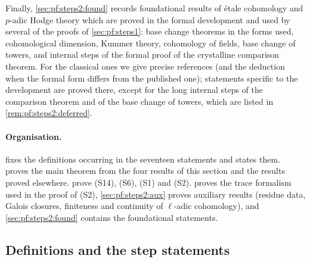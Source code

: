 Finally, \cref{sec:pf:steps2:found} records foundational results of \'etale cohomology and $p$-adic
Hodge theory which are proved in the formal development and used by several of the proofs of
\cref{sec:pf:steps1}: base change theorems in the forms used, cohomological dimension, Kummer
theory, cohomology of fields, base change of towers, and internal steps of the formal proof of the
crystalline comparison theorem. For the classical ones we give precise references (and the deduction
when the formal form differs from the published one); statements specific to the development are
proved there, except for the long internal steps of the comparison theorem and of the base change of
towers, which are listed in \cref{rem:pf:steps2:deferred}.

\paragraph{Organisation.}
 fixes the definitions occurring in the seventeen statements and states
them.  proves the main theorem from the four results of this section
and the results proved elsewhere.
 prove (S14), (S6),
(S1) and (S2).  proves the trace formalism used in the proof of (S2),
\cref{sec:pf:steps2:aux} proves auxiliary results (residue data, Galois closures, finiteness and
continuity of $\ell$-adic cohomology), and \cref{sec:pf:steps2:found} contains the foundational
statements.

\subsection{Definitions and the step statements}\label{sec:pf:steps2:defs}

